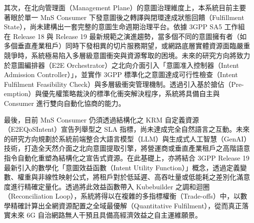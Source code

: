其次，在北向管理面（Management Plane）的意圖治理維度上，本系統目前主要著眼於單一 MnS Consumer 下發意圖後之轉譯與閉環達成狀態回饋（Fulfillment State），尚未建構出一套完整的意圖生命週期治理平台。依據 3GPP SA5 工作組在 Release 18 與 Release 19 最新規範之演進趨勢，當多個不同的意圖擁有者（如多個垂直產業租戶）同時下發相異的切片服務期望，或網路底層實體資源面臨嚴重競爭時，系統極易陷入多層級意圖衝突與資源奪取的困境。未來的研究方向將致力於意圖編排器（E2E Orchestrator）之北向介面引入「意圖准入控制器（Intent Admission Controller）」，並實作 3GPP 標準化之意圖達成可行性檢查（Intent Fulfilment Feasibility Check）與多層級衝突管理機制。透過引入基於搶佔（Pre-emption）與優先權策略裁決的標準化衝突解決程序，系統將具備自主與 Consumer 進行雙向自動化協商的能力。

最後，目前 MnS Consumer 仍須透過結構化之 KRM 自定義資源（E2EQoSIntent）宣告列舉型之 SLA 指標，尚未達成完全自然語言之互動。未來的研究方向規劃於系統前端整合大語言模型（LLM）與生成式人工智慧（GenAI）技術，打造全天然介面之北向意圖提取引擎，將營運商或垂直產業租戶之高階語意指令自動化重塑為結構化之宣告式資源。在此基礎上，亦將結合 3GPP Release 19 最新引入的數學化「意圖效益函數（Intent Utility Function）」概念，透過定義變數、權重與非線性映射公式，將租戶對於低延遲、高吞吐量或低能耗之差別化滿意度進行精確定量化。透過將此效益函數帶入 Kubebuilder 之調和迴圈（Reconciliation Loop），系統將得以在複雜的多指標權衡（Trade-offs）中，以數學精確計算出全網資源配置之全域最優解（Quantitative Fulfilment），從而真正落實未來 6G 自治網路無人干預且具備高經濟效益之自主運維願景。